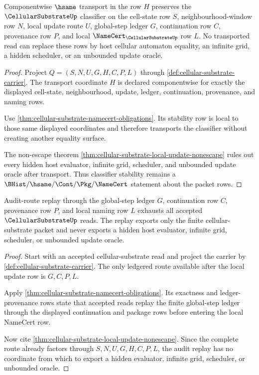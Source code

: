 \begin{theorem}
\label{thm:cellular-substrate-classifier-stability-obligation}
Componentwise $\hsame$ transport in the row $H$ preserves the $\CellularSubstrateUp$ classifier on the cell-state row $S$, neighbourhood-window row $N$, local update route $U$, global-step ledger $G$, continuation row $C$, provenance row $P$, and local $\NameCert_{\CellularSubstrateUp}$ row $L$. No transported read can replace these rows by host cellular automaton equality, an infinite grid, a hidden scheduler, or an unbounded update oracle.
\end{theorem}
\begin{proof}
Project $Q=(S,N,U,G,H,C,P,L)$ through \autoref{def:cellular-substrate-carrier}. The transport coordinate $H$ is declared componentwise for exactly the displayed cell-state, neighbourhood, update, ledger, continuation, provenance, and naming rows.

Use \autoref{thm:cellular-substrate-namecert-obligations}. Its stability row is local to those same displayed coordinates and therefore transports the classifier without creating another equality surface.

The non-escape theorem \autoref{thm:cellular-substrate-local-update-nonescape} rules out every hidden host evaluator, infinite grid, scheduler, and unbounded update oracle after transport. Thus classifier stability remains a $\BHist/\hsame/\Cont/\Pkg/\NameCert$ statement about the packet rows.
\end{proof}

\begin{theorem}
\label{thm:cellular-substrate-ledger-replay-obligation}
Audit-route replay through the global-step ledger $G$, continuation row $C$, provenance row $P$, and local naming row $L$ exhausts all accepted $\CellularSubstrateUp$ reads. The replay exports only the finite cellular-substrate packet and never exports a hidden host evaluator, infinite grid, scheduler, or unbounded update oracle.
\end{theorem}
\begin{proof}
Start with an accepted cellular-substrate read and project the carrier by \autoref{def:cellular-substrate-carrier}. The only ledgered route available after the local update row is $G,C,P,L$.

Apply \autoref{thm:cellular-substrate-namecert-obligations}. Its exactness and ledger-provenance rows state that accepted reads replay the finite global-step ledger through the displayed continuation and package rows before entering the local NameCert row.

Now cite \autoref{thm:cellular-substrate-local-update-nonescape}. Since the complete route already factors through $S,N,U,G,H,C,P,L$, the audit replay has no coordinate from which to export a hidden evaluator, infinite grid, scheduler, or unbounded oracle.
\end{proof}

